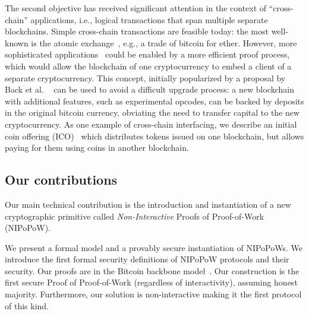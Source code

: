 %
The second objective has received  significant attention in the context of
``cross-chain'' applications, i.e., logical transactions that span multiple
separate blockchains. Simple cross-chain transactions are feasible today: the
most well-known is the atomic exchange~\cite{tiernolan,herlihy2018atomic}, e.g.,
a trade of bitcoin for ether. However, more sophisticated
applications~
\cite{interledger,DBLP:journals/corr/DilleyPWPGF16,
      lerner,drivechains,wood2016polkadot,buchman2016tendermint}
could be enabled by a more efficient proof process, which would allow the
blockchain of one cryptocurrency to embed a client of a separate cryptocurrency.
This concept, initially popularized by a proposal by Back et al.
~\cite{sidechains} can be used to avoid a difficult upgrade process: a new
blockchain with additional features, such as experimental opcodes, can be backed
by deposits in the original bitcoin currency, obviating the need to transfer
capital to the new cryptocurrency. As one example of cross-chain interfacing, we
describe an initial coin offering (ICO)~\cite{ico} which distributes tokens
issued on one blockchain, but allows paying for them using coins in another
blockchain.


\subsection{Our contributions}
Our main technical contribution is the introduction and instantiation of a new
cryptographic primitive called \textit{Non-Interactive} Proofs of Proof-of-Work
(NIPoPoW).

We present a formal model and a provably secure instantiation of NIPoPoWs. We
introduce the first formal security definitions of NIPoPoW protocols and their
security. Our proofs are in the Bitcoin backbone model~\cite{backbone}. Our
construction is the first secure Proof of Proof-of-Work (regardless of
interactivity), assuming honest majority. Furthermore, our solution is
non-interactive making it the first protocol of this kind.


